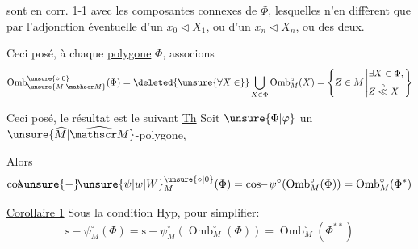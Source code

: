  sont en corr. 1-1 avec les composantes connexes de $\Phi$, lesquelles n'en diffèrent que par l'adjonction éventuelle d'un $x_0\triangleleft X_1$, ou d'un $x_n\triangleleft X_n$, ou des deux.

 Ceci posé, à chaque \uline{polygone} $\Phi$, associons
\[
\operatorname{Omb}^{\unsure{\circ|0}}_{\unsure{M|\mathscr M}}(\Phi)=\deleted{\unsure{\forall X\in}}\bigcup_{X\in\Phi}\operatorname{Omb}^{\circ}_M(X)
=\left\{Z\in M\left|\begin{aligned}&\exists X\in\Phi,\\&Z\overset{\circ}{\ll}X\end{aligned}\right.\right\}
\]

Ceci posé, le résultat  est le suivant
\uline{Th} Soit $\unsure{\Phi|\varphi}$ un $\unsure{\widehat M|\widehat{\mathscr M}}$-polygone, 





Alors
\[
\mathrm{cos}\!\!\unsure{-}\!{\unsure{\psi|w|W}}^{\unsure{\circ|0}}_M(\Phi)=\mathrm{cos}\!\!-\!\psi^{\circ}(\operatorname{Omb}^{\circ}_M(\Phi))=\operatorname{Omb}^{\circ}_M(\Phi^*)
\]

\uline{Corollaire 1} Sous la condition Hyp, pour simplifier:
\[
\mathrm{s}\!-\!\psi^{\circ}_M(\Phi)=\mathrm{s}\!-\!\psi^{\circ}_M(\operatorname{Omb}^{\circ}_M(\Phi))=\operatorname{Omb}^{\circ}_M(\Phi^{**})
\]

